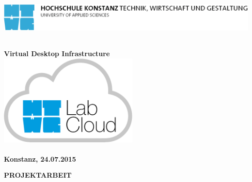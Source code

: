\begin{titlepage}

\vspace*{-3.5cm}

\begin{flushleft}
\hspace*{-1cm} \includegraphics[width=15.7cm]{include/htwg-logo.pdf}
\end{flushleft}

\vspace{2cm}

\begin{center}
	\huge{
		\textbf{\thema} \\[0.3cm]
	}
	\large{
		\textbf{Virtual Desktop Infrastructure} \\[2cm]
	}
	\includegraphics[width=7cm]{img/logo.png} \\[2cm]
	\Large{
		\textbf{\studiengang}
	}\\[1cm]
	\large{
		\textbf{Konstanz, 24.07.2015} \\[2.5cm]
	}
	
	\Huge{
		\textbf{{\sf PROJEKTARBEIT}}
	}
\end{center}

\end{titlepage}